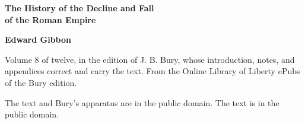 \documentclass[11pt,letterpaper]{article}
\begin{document}
\color{ink}

\begin{titlepage}
\centering
\vspace*{4em}
{\LARGE\bfseries\color{heading} The History of the Decline and Fall\\[0.3em]of the Roman Empire\par}
\vspace{2em}
{\Large\bfseries\color{heading} Edward Gibbon\par}
\vspace{2.5em}
{\itshape\color{subhead}\parbox{0.8\linewidth}{\centering Volume 8 of twelve, in the edition of J. B. Bury, whose introduction, notes, and appendices correct and carry the text. From the Online Library of Liberty ePubs of the Bury edition.\par}}
\vfill
{\small The text and Bury's apparatus are in the public domain. The text is in the public domain.\par}
\vspace{2em}
\end{titlepage}

\tableofcontents


\end{document}
